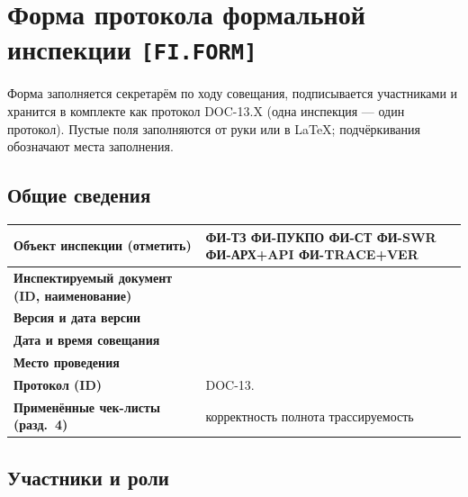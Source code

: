 \documentclass[12pt,a4paper]{article}
\begin{document}
\section{Форма протокола формальной инспекции \texttt{[FI.FORM]}}

Форма заполняется секретарём по ходу совещания, подписывается участниками и
хранится в комплекте как протокол DOC-13.X (одна инспекция --- один протокол).
Пустые поля заполняются от руки или в LaTeX; подчёркивания обозначают места
заполнения.

\subsection{Общие сведения}

\begin{table}[h!]
\centering
\begin{tabularx}{\textwidth}{|>{\raggedright\arraybackslash}p{5.2cm}|>{\raggedright\arraybackslash}X|}
\hline
\textbf{Объект инспекции (отметить)} &
ФИ-ТЗ \quad ФИ-ПУКПО \quad ФИ-СТ \quad ФИ-SWR \quad ФИ-АРХ+API \quad ФИ-TRACE+VER \\ \hline
\textbf{Инспектируемый документ (ID, наименование)} & \underline{\hspace{8cm}} \\ \hline
\textbf{Версия и дата версии} & \underline{\hspace{8cm}} \\ \hline
\textbf{Дата и время совещания} & \underline{\hspace{8cm}} \\ \hline
\textbf{Место проведения} & \underline{\hspace{8cm}} \\ \hline
\textbf{Протокол (ID)} & DOC-13.\underline{\hspace{1cm}} \\ \hline
\textbf{Применённые чек-листы (разд.~4)} & корректность \quad полнота \quad трассируемость \\ \hline
\end{tabularx}
\end{table}

\subsection{Участники и роли}
\end{document}
